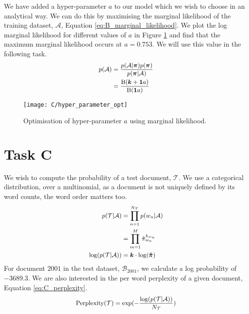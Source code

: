 \documentclass[11pt]{article}
\begin{document}
We have added a hyper-parameter $a$ to our model which we wish to choose in an analytical way. We can do this by maximising the marginal likelihood of the training dataset, $\mathcal{A}$, Equation \ref{eq:B_marginal_likelihood}. We plot the log marginal likelihood for different values of $a$ in Figure \ref{fig:C_hyper_parameter_opt} and find that the maximum marginal likelihood occurs at $a = 0.753$. We will use this value in the following task.
\begin{equation}
    \small
    \begin{aligned}
        p(\mathcal{A}) &= \frac{p(\mathcal{A} | \boldsymbol{\pi}) p(\boldsymbol{\pi})}{p(\boldsymbol{\pi} | \mathcal{A})} \\
          &= \frac{\text{B}(\boldsymbol{k} + \boldsymbol{1} a)}{\text{B}(\boldsymbol{1} a)} \\ 
    \end{aligned}
    \label{eq:B_marginal_likelihood}
\end{equation}

\begin{figure}
    \centering
    \texttt{[image: C/hyper\_parameter\_opt]}
    \caption{Optimisation of hyper-parameter $a$ using marginal likelihood.}
    \label{fig:C_hyper_parameter_opt}
\end{figure}

\section{Task C}
We wish to compute the probability of a test document, $\mathcal{T}$. We use a categorical distribution, over a multinomial, as a document is not uniquely defined by its word counts, the word order matters too.
\begin{equation}
    \small
    \begin{aligned}
        p(\mathcal{T} | \mathcal{A}) &= \prod_{n=1}^{N_{\mathcal{T}}} p(w_n | \mathcal{A}) \\
          &= \prod_{m=1}^{M} \hat \pi_{w_n}^{k_{w_n}} \\
        \log(p(\mathcal{T} | \mathcal{A})) &=  \boldsymbol{k} \cdot \log(\boldsymbol{\hat \pi})
    \end{aligned}
\end{equation}
For document $2001$ in the test dataset, $\mathcal{B}_{2001}$, we calculate a log probability of $-3689.3$. We are also interested in the per word perplexity of a given document, Equation \ref{eq:C_perplexity}. 
\begin{equation}
    \small
    \begin{aligned}
        \text{Perplexity}(\mathcal{T}) &= \exp(-\frac{\log(p(\mathcal{T} | \mathcal{A}))}{N_{\mathcal{T}}} ) \\
    \end{aligned}
    \label{eq:C_perplexity}
\end{equation}
\end{document}
